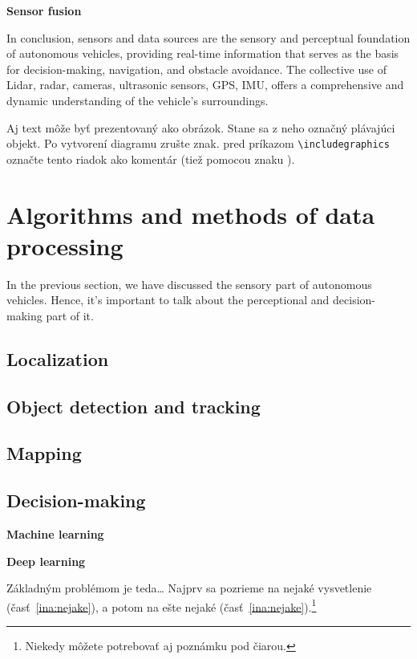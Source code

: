 \documentclass[10pt,oneside,english,a4paper]{article}
\begin{document}
{\bfseries\large Sensor fusion}\newline



In conclusion, sensors and data sources are the sensory and perceptual foundation of autonomous vehicles, providing real-time information that serves as the basis for decision-making, navigation, and obstacle avoidance. The collective use of Lidar, radar, cameras, ultrasonic sensors, GPS, IMU, offers a comprehensive and dynamic understanding of the vehicle's surroundings.

Aj text môže byť prezentovaný ako obrázok. Stane sa z neho označný plávajúci objekt. Po vytvorení diagramu zrušte znak. pred príkazom \verb|\includegraphics| označte tento riadok ako komentár (tiež pomocou znaku ).


\section{Algorithms and methods of data processing} \label{algorithms}

In the previous section, we have discussed the sensory part of autonomous vehicles. Hence, it's important to talk about the perceptional and decision-making part of it. 

\subsection{Localization}

\subsection{Object detection and tracking}

\subsection{Mapping}

\subsection{Decision-making}

{\bfseries\large Machine learning}\newline


{\bfseries\large Deep learning}\newline

Základným problémom je teda\ldots{} Najprv sa pozrieme na nejaké vysvetlenie (časť~\ref{ina:nejake}), a potom na ešte nejaké (časť~\ref{ina:nejake}).\footnote{Niekedy môžete potrebovať aj poznámku pod čiarou.}
\end{document}

